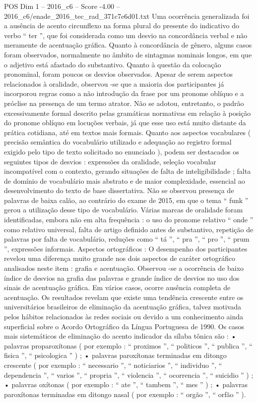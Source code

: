 \begin{textsample}{POS Dim 1 – 2016\_c6 – Score -4.00 – 2016\_c6/enade\_2016\_tec\_rad\_371c7e6d01.txt}
Uma ocorrência generalizada foi a ausência de acento circunflexo na forma plural do presente do indicativo do verbo “ ter ”, que foi considerada como um desvio na concordância verbal e não meramente de acentuação gráfica.
Quanto à concordância de gênero, alguns casos foram observados, normalmente no âmbito de sintagmas nominais longos, em que o adjetivo está afastado do substantivo.
Quanto à questão da colocação pronominal, foram poucos os desvios observados.
Apesar de serem aspectos relacionados à oralidade, observou -se que a maioria dos participantes já incorporou regras como a não introdução da frase por um pronome oblíquo e a próclise na presença de um termo atrator.
Não se adotou, entretanto, o padrão excessivamente formal descrito pelas gramáticas normativas em relação à posição do pronome oblíquo em locuções verbais, já que esse uso está muito distante da prática cotidiana, até em textos mais formais.
Quanto aos aspectos vocabulares ( precisão semântica do vocabulário utilizado e adequação ao registro formal exigido pelo tipo de texto solicitado no enunciado ), podem ser destacados os seguintes tipos de desvios : expressões da oralidade, seleção vocabular incompatível com o contexto, gerando situações de falta de inteligibilidade ; falta de domínio de vocabulário mais abstrato e de maior complexidade, essencial ao desenvolvimento do texto de base dissertativa.
Não se observou presença de palavras de baixa calão, ao contrário do exame de 2015, em que o tema “ funk ” gerou a utilização desse tipo de vocabulário.
Várias marcas de oralidade foram identificadas, embora não em alta frequência : o uso do pronome relativo “ onde ” como relativo universal, falta de artigo definido antes de substantivo, repetição de palavras por falta de vocabulário, reduções como “ tá ”, “ pra ”, “ pro ”, “ prum ”, expressões informais.
Aspectos ortográficos : O desempenho dos participantes revelou uma diferença muito grande nos dois aspectos de caráter ortográfico analisados neste item : grafia e acentuação.
Observou -se a ocorrência de baixo índice de desvios na grafia das palavras e grande índice de desvios no uso dos sinais de acentuação gráfica.
Em vários casos, ocorre ausência completa de acentuação.
Os resultados revelam que existe uma tendência crescente entre os universitários brasileiros de eliminação da acentuação gráfica, talvez motivada pelos hábitos relacionados às redes sociais ou devido a um conhecimento ainda superficial sobre o Acordo Ortográfico da Língua Portuguesa de 1990.
Os casos mais sistemáticos de eliminação do acento indicador da sílaba tônica são : • palavras proparoxítonas ( por exemplo : “ proximos ”, “ politicos ”, “ publica ”, “ fisica ”, “ psicologica ” ) ; • palavras paroxítonas terminadas em ditongo crescente ( por exemplo : “ necessario ”, “ noticiarios ”, “ individuo ”, “ dependencia ”, “ varios ”, “ propria ”, “ violencia ”, “ ocorrencia ”, “ suicidio ” ) ; • palavras oxítonas ( por exemplo : “ ate ”, “ tambem ”, “ mes ” ) ; • palavras paroxítonas terminadas em ditongo nasal ( por exemplo : “ orgão ”, “ orfão ” ).

\end{textsample}
